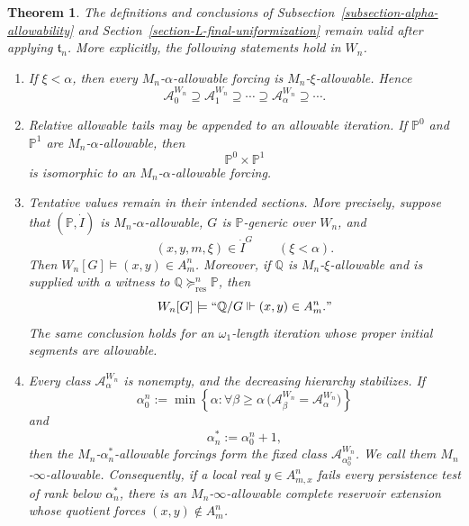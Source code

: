 \documentclass[a4paper,11pt]{article}
\newtheorem{theorem}{Theorem}[section]
\newcommand{\forceP}{\mathbb{P}}
\newcommand{\forceQ}{\mathbb{Q}}
\begin{document}
\begin{theorem}
\label{theorem-transfer-fixed-point-to-Mn}
The definitions and conclusions of
Subsection~\ref{subsection-alpha-allowability} and
Section~\ref{section-L-final-uniformization} remain valid after applying
$\mathfrak t_n$.  More explicitly, the following statements hold in $W_n$.
\begin{enumerate}
   \item If $\xi<\alpha$, then every $M_n$-$\alpha$-allowable forcing is
         $M_n$-$\xi$-allowable.  Hence
         \[
            \mathcal A^{W_n}_0\supseteq
            \mathcal A^{W_n}_1\supseteq\cdots\supseteq
            \mathcal A^{W_n}_\alpha\supseteq\cdots.
         \]

   \item Relative allowable tails may be appended to an allowable iteration.
         If $\forceP^0$ and $\forceP^1$ are $M_n$-$\alpha$-allowable, then
         \[
            \forceP^0\times\forceP^1
         \]
         is isomorphic to an $M_n$-$\alpha$-allowable forcing.

   \item Tentative values remain in their intended sections.  More precisely,
         suppose that $(\forceP,\dot I)$ is $M_n$-$\alpha$-allowable,
         $G$ is $\forceP$-generic over $W_n$, and
         \[
            (x,y,m,\xi)\in\dot I^G
            \qquad(\xi<\alpha).
         \]
         Then $W_n[G]\models(x,y)\in A^n_m$.  Moreover, if $\forceQ$ is
         $M_n$-$\xi$-allowable and is supplied with a witness to
         $\forceQ\succeq^n_{\mathrm{res}}\forceP$, then
         \[
            W_n[G]\models
            ``\forceQ/G\Vdash(x,y)\in A^n_m."
         \]
         The same conclusion holds for an $\omega_1$-length iteration
         whose proper initial segments are allowable.

   \item Every class $\mathcal A^{W_n}_\alpha$ is nonempty, and the decreasing
         hierarchy stabilizes.  If
         \[
            \alpha^n_0
            :=\min\left\{\alpha:
               \forall\beta\geq\alpha\,
               \bigl(\mathcal A^{W_n}_\beta
                     =\mathcal A^{W_n}_\alpha\bigr)
            \right\}
         \]
         and
         \[
            \alpha_n^\ast:=\alpha^n_0+1,
         \]
         then the $M_n$-$\alpha_n^\ast$-allowable forcings form the fixed
         class $\mathcal A^{W_n}_{\alpha^n_0}$.  We call them
         \emph{$M_n$-$\infty$-allowable}.  Consequently, if a local real
         $y\in A^n_{m,x}$ fails every persistence test of rank below
         $\alpha_n^\ast$, there is an $M_n$-$\infty$-allowable complete
         reservoir extension whose quotient forces $(x,y)\notin A^n_m$.


\end{enumerate}
\end{theorem}
\end{document}
